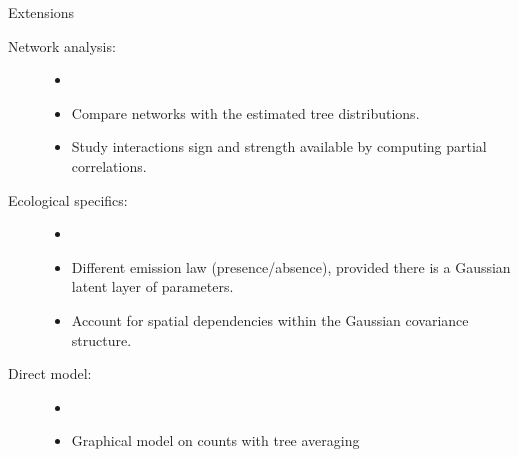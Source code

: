\documentclass[11pt]{beamer}
\begin{document}
 \begin{frame}{Extensions}
 \begin{description}
 \item[Network analysis:] \begin{itemize}
\item[]
\item Compare networks with the estimated tree distributions.
\item Study interactions sign and strength available by computing partial correlations.
\end{itemize}
\item[Ecological specifics:]\begin{itemize}
\item[]
\item Different emission law (presence/absence), provided there is a Gaussian latent layer of parameters.
\item Account for spatial dependencies within the Gaussian covariance structure.
\end{itemize}
\item[Direct model:] \begin{itemize}
\item[] 
\item Graphical model on counts with tree averaging

\end{itemize}
\end{description}
 \end{frame}
 
\end{document}
